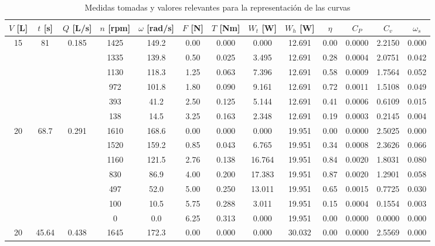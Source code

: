\documentclass[10pt]{IEEEtran}
\begin{document}
\begin{table}[ht!]
  \centering
  \caption{Medidas tomadas y valores relevantes para la representación de las curvas}
  \label{tab: Medidas tomadas y valores relevantes para la representación de las curvas}
  \begin{tabular}{|c|c|c|c|c|c|c|c|c|c|c|c|c|}
    \hline
    $V$ [L] & $t$ [s] & $Q$ [L/s] & $n$ [rpm] & $\omega$ [rad/s] & $F$ [N] & $T$ [Nm] & $W_t$ [W] & $W_h$ [W] & $\eta$ & $C_P$ & $C_v$ & $\omega_s$ \\
    \hline
    \multirow{6}{*}{15} & \multirow{6}{*}{81} & \multirow{6}{*}{0.185} & 1425 & 149.2 & 0.00 & 0.000 & 0.000 & 12.691 & 0.00 & 0.0000 & 2.2150 & 0.000 \\
    \cline{4-13}
    & & & 1335 & 139.8 & 0.50 & 0.025 & 3.495 & 12.691 & 0.28 & 0.0004 & 2.0751 & 0.042 \\
    \cline{4-13}
    & & & 1130 & 118.3 & 1.25 & 0.063 & 7.396 & 12.691 & 0.58 & 0.0009 & 1.7564 & 0.052 \\
    \cline{4-13}
    & & & 972  & 101.8 & 1.80 & 0.090 & 9.161 & 12.691 & 0.72 & 0.0011 & 1.5108 & 0.049 \\
    \cline{4-13}
    & & & 393  & 41.2  & 2.50 & 0.125 & 5.144 & 12.691 & 0.41 & 0.0006 & 0.6109 & 0.015 \\
    \cline{4-13}
    & & & 138  & 14.5  & 3.25 & 0.163 & 2.348 & 12.691 & 0.19 & 0.0003 & 0.2145 & 0.004 \\
    \hline
    \multirow{7}{*}{20} & \multirow{7}{*}{68.7} & \multirow{7}{*}{0.291} & 1610 & 168.6 & 0.00 & 0.000 & 0.000 & 19.951 & 0.00 & 0.0000 & 2.5025 & 0.000 \\
    \cline{4-13}
    & & & 1520 & 159.2 & 0.85 & 0.043 & 6.765 & 19.951 & 0.34 & 0.0008 & 2.3626 & 0.066 \\
    \cline{4-13}
    & & & 1160 & 121.5 & 2.76 & 0.138 & 16.764 & 19.951 & 0.84 & 0.0020 & 1.8031 & 0.080 \\
    \cline{4-13}
    & & & 830  & 86.9  & 4.00 & 0.200 & 17.383 & 19.951 & 0.87 & 0.0020 & 1.2901 & 0.058 \\
    \cline{4-13}
    & & & 497  & 52.0  & 5.00 & 0.250 & 13.011 & 19.951 & 0.65 & 0.0015 & 0.7725 & 0.030 \\
    \cline{4-13}
    & & & 100  & 10.5  & 5.75 & 0.288 & 3.011 & 19.951 & 0.15 & 0.0004 & 0.1554 & 0.003 \\
    \cline{4-13}
    & & & 0    & 0.0   & 6.25 & 0.313 & 0.000 & 19.951 & 0.00 & 0.0000 & 0.0000 & 0.000 \\
    \hline
    \multirow{6}{*}{20} & \multirow{6}{*}{45.64} & \multirow{6}{*}{0.438} & 1645 & 172.3 & 0.00 & 0.000 & 0.000 & 30.032 & 0.00 & 0.0000 & 2.5569 & 0.000 \\

\end{tabular}
\end{table}
\end{document}
